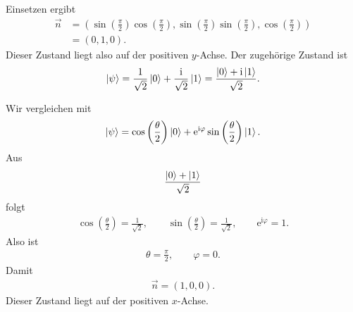 \documentclass[11pt,a4paper]{scrartcl}
\newcommand{\e}{\mathrm e}
\newcommand{\ii}{\mathrm i}
\begin{document}
\begin{enumerate}[label=(\alph*)]
\begin{calculationbox}
            \begin{calculationbox}[title={Zustand mit $\theta=\pi/2$ und $\varphi=\pi/2$}]
                Einsetzen ergibt
                \begin{align*}
                    \vec n
                    &=
                    \left(
                        \sin\left(\frac{\pi}{2}\right)\cos\left(\frac{\pi}{2}\right),
                        \sin\left(\frac{\pi}{2}\right)\sin\left(\frac{\pi}{2}\right),
                        \cos\left(\frac{\pi}{2}\right)
                    \right)\\
                    &=
                    (0,1,0).
                \end{align*}
                Dieser Zustand liegt also auf der positiven $y$-Achse.
                Der zugehörige Zustand ist
                \begin{align*}
                    \ket{\psi}
                    =
                    \frac{1}{\sqrt2}\ket{0}
                    +
                    \frac{\ii}{\sqrt2}\ket{1}
                    =
                    \frac{\ket{0}+\ii\ket{1}}{\sqrt2}.
                \end{align*}
            \end{calculationbox}

            \begin{calculationbox}[title=Zustand $(\ket{0}+\ket{1})/\sqrt2$]
                Wir vergleichen mit
                \begin{align*}
                    \ket{\psi}
                    =
                    \cos\left(\frac{\theta}{2}\right)\ket{0}
                    +
                    \e^{\ii\varphi}\sin\left(\frac{\theta}{2}\right)\ket{1}.
                \end{align*}
                Aus
                \begin{align*}
                    \frac{\ket{0}+\ket{1}}{\sqrt2}
                \end{align*}
                folgt
                \begin{align*}
                    \cos\left(\frac{\theta}{2}\right)=\frac1{\sqrt2},
                    \qquad
                    \sin\left(\frac{\theta}{2}\right)=\frac1{\sqrt2},
                    \qquad
                    \e^{\ii\varphi}=1.
                \end{align*}
                Also ist
                \begin{align*}
                    \theta=\frac{\pi}{2},
                    \qquad
                    \varphi=0.
                \end{align*}
                Damit
                \begin{align*}
                    \vec n
                    =
                    (1,0,0).
                \end{align*}
                Dieser Zustand liegt auf der positiven $x$-Achse.
            \end{calculationbox}


\end{calculationbox}
\end{enumerate}
\end{document}
